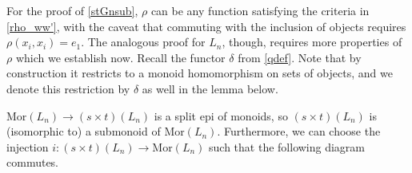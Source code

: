 \documentclass{amsbook} %
\newcommand{\MorLn}{\mathrm{Mor}(L_n)}
\numberwithin{section}{chapter}
\begin{document}
For the proof of \cref{stGnsub}, $\rho$ can be any function satisfying the criteria in \cref{rho_ww'}, with the caveat that commuting with the inclusion of objects requires $\rho(x_i, x_i) = e_1$. The analogous proof for $L_n$, though, requires more properties of $\rho$ which we establish now. Recall the functor $\delta$ from \cref{qdef}. Note that by construction it restricts to a monoid homomorphism on sets of objects, and we denote this restriction by $\delta$ as well in the lemma below.

\begin{prop} \label{stZsub} $\MorLn \to (s \times t)(L_n)$ is a split epi of monoids, so $(s \times t)(L_n)$ is (isomorphic to) a submonoid of $\MorLn$. Furthermore, we can choose the injection $i:(s \times t)(L_n) \to \MorLn$ such that the following diagram commutes.
\begin{center}
\end{center}		
\end{prop}
\end{document}
